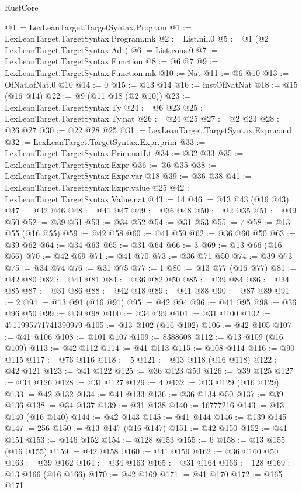 \begin{lexlean}{RustCore}
\begin{coremodule}
@0 := LexLeanTarget.TargetSyntax.Program
@1 := LexLeanTarget.TargetSyntax.Program.mk
@2 := List.nil.{0}
@5 := @1 (@2 LexLeanTarget.TargetSyntax.Adt)
@6 := List.cons.{0}
@7 := LexLeanTarget.TargetSyntax.Function
@8 := @6 @7
@9 := LexLeanTarget.TargetSyntax.Function.mk
@10 := Nat
@11 := @6 @10
@13 := OfNat.ofNat.{0} @10
@14 := 0
@15 := @13 @14
@16 := instOfNatNat
@18 := @15 (@16 @14)
@22 := @9 (@11 @18 (@2 @10))
@23 := LexLeanTarget.TargetSyntax.Ty
@24 := @6 @23
@25 := LexLeanTarget.TargetSyntax.Ty.nat
@26 := @24 @25
@27 := @2 @23
@28 := @26 @27
@30 := @22 @28 @25
@31 := LexLeanTarget.TargetSyntax.Expr.cond
@32 := LexLeanTarget.TargetSyntax.Expr.prim
@33 := LexLeanTarget.TargetSyntax.Prim.natLt
@34 := @32 @33
@35 := LexLeanTarget.TargetSyntax.Expr
@36 := @6 @35
@38 := LexLeanTarget.TargetSyntax.Expr.var @18
@39 := @36 @38
@41 := LexLeanTarget.TargetSyntax.Expr.value @25
@42 := LexLeanTarget.TargetSyntax.Value.nat
@43 := 14
@46 := @13 @43 (@16 @43)
@47 := @42 @46
@48 := @41 @47
@49 := @36 @48
@50 := @2 @35
@51 := @49 @50
@52 := @39 @51
@53 := @34 @52
@54 := @31 @53
@55 := 7
@58 := @13 @55 (@16 @55)
@59 := @42 @58
@60 := @41 @59
@62 := @36 @60 @50
@63 := @39 @62
@64 := @34 @63
@65 := @31 @64
@66 := 3
@69 := @13 @66 (@16 @66)
@70 := @42 @69
@71 := @41 @70
@73 := @36 @71 @50
@74 := @39 @73
@75 := @34 @74
@76 := @31 @75
@77 := 1
@80 := @13 @77 (@16 @77)
@81 := @42 @80
@82 := @41 @81
@84 := @36 @82 @50
@85 := @39 @84
@86 := @34 @85
@87 := @31 @86
@88 := @42 @18
@89 := @41 @88
@90 := @87 @89
@91 := 2
@94 := @13 @91 (@16 @91)
@95 := @42 @94
@96 := @41 @95
@98 := @36 @96 @50
@99 := @39 @98
@100 := @34 @99
@101 := @31 @100
@102 := 4711995771741390979
@105 := @13 @102 (@16 @102)
@106 := @42 @105
@107 := @41 @106
@108 := @101 @107
@109 := 8388608
@112 := @13 @109 (@16 @109)
@113 := @42 @112
@114 := @41 @113
@115 := @108 @114
@116 := @90 @115
@117 := @76 @116
@118 := 5
@121 := @13 @118 (@16 @118)
@122 := @42 @121
@123 := @41 @122
@125 := @36 @123 @50
@126 := @39 @125
@127 := @34 @126
@128 := @31 @127
@129 := 4
@132 := @13 @129 (@16 @129)
@133 := @42 @132
@134 := @41 @133
@136 := @36 @134 @50
@137 := @39 @136
@138 := @34 @137
@139 := @31 @138
@140 := 16777216
@143 := @13 @140 (@16 @140)
@144 := @42 @143
@145 := @41 @144
@146 := @139 @145
@147 := 256
@150 := @13 @147 (@16 @147)
@151 := @42 @150
@152 := @41 @151
@153 := @146 @152
@154 := @128 @153
@155 := 6
@158 := @13 @155 (@16 @155)
@159 := @42 @158
@160 := @41 @159
@162 := @36 @160 @50
@163 := @39 @162
@164 := @34 @163
@165 := @31 @164
@166 := 128
@169 := @13 @166 (@16 @166)
@170 := @42 @169
@171 := @41 @170
@172 := @165 @171

\end{coremodule}
\end{lexlean}
